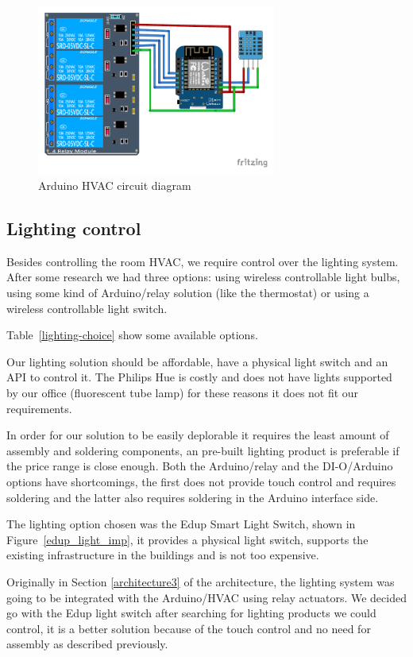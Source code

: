 \begin{figure}[h]
\centering
\includegraphics[width=0.7\textwidth]{Figures/arduino_imp}
\caption{Arduino HVAC circuit diagram}
\label{arduino_imp}
\end{figure}



\subsection{Lighting control}
Besides controlling the room \ac{HVAC}, we require control over the lighting system. After some research we had three options: using wireless controllable light bulbs, using some kind of Arduino/relay solution (like the thermostat) or using a wireless controllable light switch.

Table~\ref{lighting-choice} show some available options.

Our lighting solution should be affordable, have a physical light switch and an API to control it. The Philips Hue is costly and does not have lights supported by our office (fluorescent tube lamp) for these reasons it does not fit our requirements.

In order for our solution to be easily deplorable it requires the least amount of assembly and soldering components, an pre-built lighting product is preferable if the price range is close enough. Both the Arduino/relay and the DI-O/Arduino options have shortcomings, the first does not provide touch control and requires soldering and the latter also requires soldering in the Arduino interface side.

The lighting option chosen was the Edup Smart Light Switch, shown in Figure~\ref{edup_light_imp},  it provides a physical light switch, supports the existing infrastructure in the buildings and is not too expensive.


Originally in Section \ref{architecture3} of the architecture, the lighting system was going to be integrated with the Arduino/\ac{HVAC} using relay actuators. We decided go with the Edup light switch after searching for lighting products we could control, it is a better solution because of the touch control and no need for assembly as described previously.

